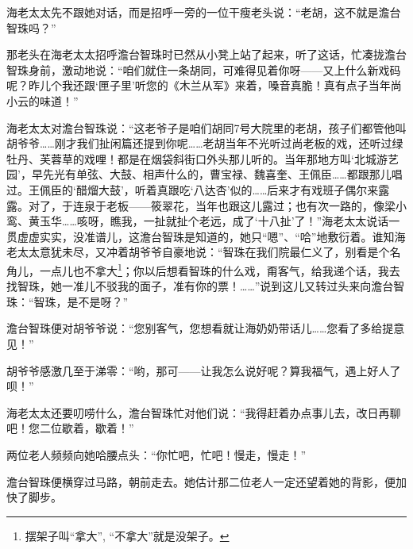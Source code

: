 \par 海老太太先不跟她对话，而是招呼一旁的一位干瘦老头说：“老胡，这不就是澹台智珠吗？”
\par 那老头在海老太太招呼澹台智珠时已然从小凳上站了起来，听了这话，忙凑拢澹台智珠身前，激动地说：“咱们就住一条胡同，可难得见着你呀——又上什么新戏码呢？昨儿个我还跟‘匣子里’听您的《木兰从军》来着，嗓音真脆！真有点子当年尚小云的味道！”
\par 海老太太对澹台智珠说：“这老爷子是咱们胡同7号大院里的老胡，孩子们都管他叫胡爷爷……刚才我们扯闲篇还提到你呢……老胡当年不光听过尚老板的戏，还听过绿牡丹、芙蓉草的戏哩！都是在烟袋斜街口外头那儿听的。当年那地方叫‘北城游艺园’，早先光有单弦、大鼓、相声什么的，曹宝禄、魏喜奎、王佩臣……都跟那儿唱过。王佩臣的‘醋熘大鼓’，听着真跟吃‘八达杏’似的……后来才有戏班子偶尔来露露。对了，于连泉于老板——筱翠花，当年也跟这儿露过；也有次一路的，像梁小鸾、黄玉华……咳呀，瞧我，一扯就扯个老远，成了‘十八扯’了！”海老太太说话一贯虚虚实实，没准谱儿，这澹台智珠是知道的，她只“嗯”、“哈”地敷衍着。谁知海老太太意犹未尽，又冲着胡爷爷自豪地说：“智珠在我们院最仁义了，别看是个名角儿，一点儿也不拿大\footnote{摆架子叫“拿大”, “不拿大”就是没架子。}；你以后想看智珠的什么戏，甭客气，给我递个话，我去找智珠，她一准儿不驳我的面子，准有你的票！……”说到这儿又转过头来向澹台智珠：“智珠，是不是呀？”
\par 澹台智珠便对胡爷爷说：“您别客气，您想看就让海奶奶带话儿……您看了多给提意见！”
\par 胡爷爷感激几至于涕零：“哟，那可——让我怎么说好呢？算我福气，遇上好人了呗！”
\par 海老太太还要叨唠什么，澹台智珠忙对他们说：“我得赶着办点事儿去，改日再聊吧！您二位歇着，歇着！”
\par 两位老人频频向她哈腰点头：“你忙吧，忙吧！慢走，慢走！”
\par 澹台智珠便横穿过马路，朝前走去。她估计那二位老人一定还望着她的背影，便加快了脚步。
